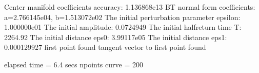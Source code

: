 \documentclass[letterpaper,10pt,english]{jupyterBook}
\begin{document}
\begin{sphinxVerbatim}[commandchars=\\\{\}]
\PYG{p}{[}\PYG{p}{]}
\end{sphinxVerbatim}

\begin{sphinxVerbatim}[commandchars=\\\{\}]
Center manifold coefficients\PYGZsq{} accuracy: 1.136868e\PYGZhy{}13
BT normal form coefficients:
a=2.766145e\PYGZhy{}04,	 b=1.513072e\PYGZhy{}02
The initial perturbation parameter epsilon:  1.000000e\PYGZhy{}01
The initial amplitude: 0.0724949
The initial half\PYGZhy{}return time T: 2264.92
The initial distance eps0: 3.99117e\PYGZhy{}05
The initial distance eps1: 0.000129927
first point found
tangent vector to first point found

elapsed time  = 6.4 secs
npoints curve = 200
\end{sphinxVerbatim}
\end{document}
